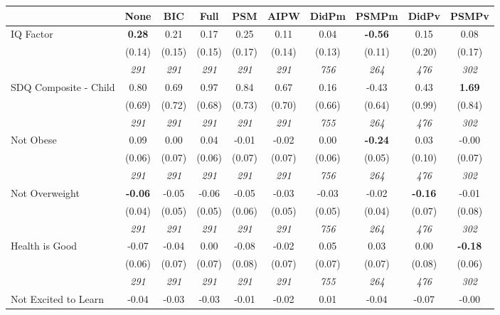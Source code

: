\begin{tabular}{l c c c c c c c c c}
\toprule
 & None & BIC & Full & PSM & AIPW & DidPm & PSMPm & DidPv & PSMPv \\
\midrule
IQ Factor & \textbf{ 0.28 } & 0.21 & 0.17 & 0.25 & 0.11 & 0.04 & \textbf{-0.56} & 0.15 & 0.08 \\
& (0.14) & (0.15) & (0.15) & (0.17) & (0.14) & (0.13) & (0.11) & (0.20) & (0.17) \\
& \textit{ 291 } & \textit{ 291 } & \textit{ 291 } & \textit{ 291 } & \textit{ 291 } & \textit{ 756 } & \textit{ 264 } & \textit{ 476 } & \textit{ 302 } \\
SDQ Composite - Child & 0.80 & 0.69 & 0.97 & 0.84 & 0.67 & 0.16 & -0.43 & 0.43 & \textbf{1.69} \\
& (0.69) & (0.72) & (0.68) & (0.73) & (0.70) & (0.66) & (0.64) & (0.99) & (0.84) \\
& \textit{ 291 } & \textit{ 291 } & \textit{ 291 } & \textit{ 291 } & \textit{ 291 } & \textit{ 755 } & \textit{ 264 } & \textit{ 476 } & \textit{ 302 } \\
Not Obese & 0.09 & 0.00 & 0.04 & -0.01 & -0.02 & 0.00 & \textbf{-0.24} & 0.03 & -0.00 \\
& (0.06) & (0.07) & (0.06) & (0.07) & (0.07) & (0.06) & (0.05) & (0.10) & (0.07) \\
& \textit{ 291 } & \textit{ 291 } & \textit{ 291 } & \textit{ 291 } & \textit{ 291 } & \textit{ 756 } & \textit{ 264 } & \textit{ 476 } & \textit{ 302 } \\
Not Overweight & \textbf{ -0.06 } & -0.05 & -0.06 & -0.05 & -0.03 & -0.03 & -0.02 & \textbf{ -0.16 } & -0.01 \\
& (0.04) & (0.05) & (0.05) & (0.06) & (0.05) & (0.05) & (0.04) & (0.07) & (0.08) \\
& \textit{ 291 } & \textit{ 291 } & \textit{ 291 } & \textit{ 291 } & \textit{ 291 } & \textit{ 756 } & \textit{ 264 } & \textit{ 476 } & \textit{ 302 } \\
Health is Good & -0.07 & -0.04 & 0.00 & -0.08 & -0.02 & 0.05 & 0.03 & 0.00 & \textbf{-0.18} \\
& (0.06) & (0.07) & (0.07) & (0.08) & (0.07) & (0.07) & (0.07) & (0.08) & (0.06) \\
& \textit{ 291 } & \textit{ 291 } & \textit{ 291 } & \textit{ 291 } & \textit{ 291 } & \textit{ 755 } & \textit{ 264 } & \textit{ 476 } & \textit{ 302 } \\
Not Excited to Learn & -0.04 & -0.03 & -0.03 & -0.01 & -0.02 & 0.01 & -0.04 & -0.07 & -0.00 \\

\end{tabular}
